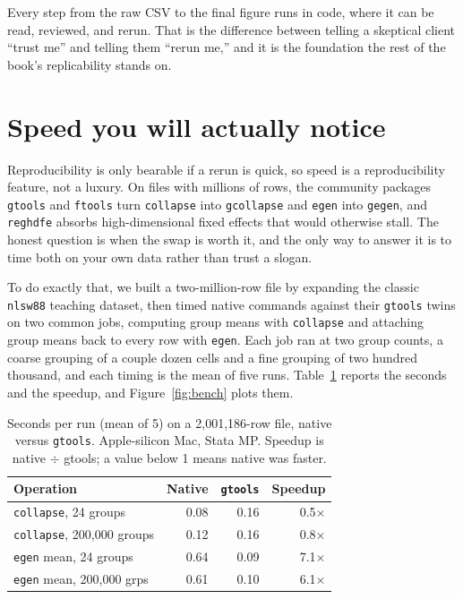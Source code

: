 \documentclass[
    a4paper,
    fontsize=10pt,
    twoside=true,
    numbers=noenddot,
]{kaobook}
\begin{document}
Every step from the raw CSV to the final figure runs in code, where it can be read, reviewed, and rerun. That is the difference between telling a skeptical client \enquote{trust me} and telling them \enquote{rerun me,} and it is the foundation the rest of the book's replicability stands on.

\section{Speed you will actually notice}\label{sec:speed}
Reproducibility is only bearable if a rerun is quick, so speed is a reproducibility feature, not a luxury. On files with millions of rows, the community packages \texttt{gtools} and \texttt{ftools} turn \texttt{collapse} into \texttt{gcollapse} and \texttt{egen} into \texttt{gegen}, and \texttt{reghdfe} absorbs high-dimensional fixed effects that would otherwise stall. The honest question is when the swap is worth it, and the only way to answer it is to time both on your own data rather than trust a slogan.

To do exactly that, we built a two-million-row file by expanding the classic \texttt{nlsw88} teaching dataset, then timed native commands against their \texttt{gtools} twins on two common jobs, computing group means with \texttt{collapse} and attaching group means back to every row with \texttt{egen}. Each job ran at two group counts, a coarse grouping of a couple dozen cells and a fine grouping of two hundred thousand, and each timing is the mean of five runs. Table~\ref{tab:bench} reports the seconds and the speedup, and Figure~\ref{fig:bench} plots them.

\begin{table}[htbp]
\centering
\footnotesize
\caption[gtools timings on two million rows]{Seconds per run (mean of 5) on a 2{,}001{,}186-row file, native versus \texttt{gtools}. Apple-silicon Mac, Stata MP. Speedup is native $\div$ gtools; a value below 1 means native was faster.}
\label{tab:bench}
\begin{tabular}{lrrr}
\hline
Operation & Native & \texttt{gtools} & Speedup \\
\hline
\texttt{collapse}, 24 groups        & 0.08 & 0.16 & 0.5$\times$ \\
\texttt{collapse}, 200{,}000 groups & 0.12 & 0.16 & 0.8$\times$ \\
\texttt{egen} mean, 24 groups       & 0.64 & 0.09 & 7.1$\times$ \\
\texttt{egen} mean, 200{,}000 grps  & 0.61 & 0.10 & 6.1$\times$ \\
\hline
\end{tabular}
\end{table}
\end{document}
